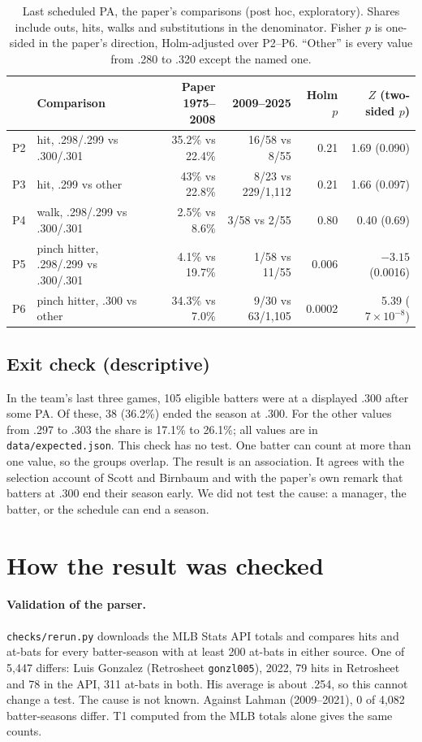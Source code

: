 \documentclass[11pt]{article}
\begin{document}
\begin{table}[t]
\centering
\caption{Last scheduled PA, the paper's comparisons (post hoc, exploratory). Shares include outs, hits, walks and substitutions in the denominator. Fisher $p$ is one-sided in the paper's direction, Holm-adjusted over P2--P6. ``Other'' is every value from .280 to .320 except the named one.}
\label{tab:paper}
\small\setlength{\tabcolsep}{3.5pt}
\begin{tabular}{llrrrr}
\toprule
 & Comparison & Paper 1975--2008 & 2009--2025 & Holm $p$ & $Z$ (two-sided $p$) \\
\midrule
P2 & hit, .298/.299 vs .300/.301 & 35.2\% vs 22.4\% & 16/58 vs 8/55 & 0.21 & 1.69 (0.090) \\
P3 & hit, .299 vs other & 43\% vs 22.8\% & 8/23 vs 229/1,112 & 0.21 & 1.66 (0.097) \\
P4 & walk, .298/.299 vs .300/.301 & 2.5\% vs 8.6\% & 3/58 vs 2/55 & 0.80 & 0.40 (0.69) \\
P5 & pinch hitter, .298/.299 vs .300/.301 & 4.1\% vs 19.7\% & 1/58 vs 11/55 & 0.006 & $-3.15$ (0.0016) \\
P6 & pinch hitter, .300 vs other & 34.3\% vs 7.0\% & 9/30 vs 63/1,105 & 0.0002 & 5.39 ($7\times10^{-8}$) \\
\bottomrule
\end{tabular}
\end{table}

\subsection{Exit check (descriptive)}

In the team's last three games, 105 eligible batters were at a displayed .300 after some PA. Of these, 38 (36.2\%) ended the season at .300. For the other values from .297 to .303 the share is 17.1\% to 26.1\%; all values are in \texttt{data/expected.json}. This check has no test. One batter can count at more than one value, so the groups overlap. The result is an association. It agrees with the selection account of Scott and Birnbaum and with the paper's own remark that batters at .300 end their season early. We did not test the cause: a manager, the batter, or the schedule can end a season.

\section{How the result was checked}
\label{sec:checks}

\paragraph{Validation of the parser.} \texttt{checks/rerun.py} downloads the MLB Stats API totals and compares hits and at-bats for every batter-season with at least 200 at-bats in either source. One of 5,447 differs: Luis Gonzalez (Retrosheet \texttt{gonzl005}), 2022, 79 hits in Retrosheet and 78 in the API, 311 at-bats in both. His average is about .254, so this cannot change a test. The cause is not known. Against Lahman (2009--2021), 0 of 4,082 batter-seasons differ. T1 computed from the MLB totals alone gives the same counts.
\end{document}
